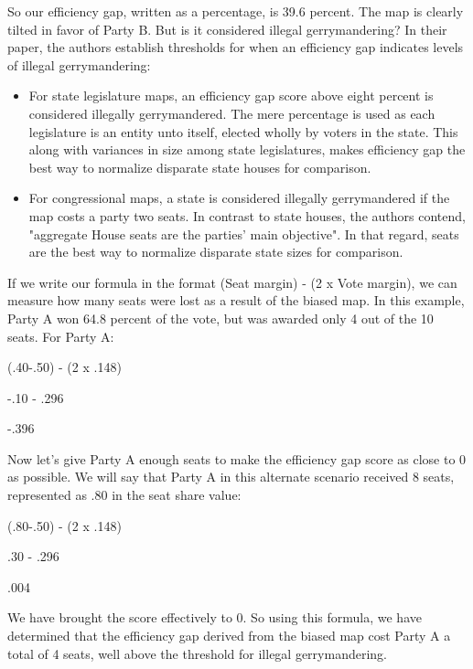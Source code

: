 \documentclass[sigconf]{acmart}
\begin{document}
So our efficiency gap, written as a percentage, is 39.6 percent. The map is clearly tilted in favor of Party B. But is it considered illegal gerrymandering? In their paper, the authors establish thresholds for when an efficiency gap indicates levels of illegal gerrymandering:

\begin{itemize}
    \item For state legislature maps, an efficiency gap score above eight percent is considered illegally gerrymandered. The mere percentage is used as each legislature is an entity unto itself, elected wholly by voters in the state. This along with variances in size among state legislatures, makes efficiency gap the best way to normalize disparate state houses for comparison.
    \item For congressional maps, a state is considered illegally gerrymandered if the map costs a party two seats. In contrast to state houses, the authors contend, "aggregate House seats are the parties' main objective". In that regard, seats are the best way to normalize disparate state sizes for comparison.\cite{chicagothreshold}
\end{itemize}

If we write our formula in the format (Seat margin) - (2 x Vote margin), we can measure how many seats were lost as a result of the biased map. In this example, Party A won 64.8 percent of the vote, but was awarded only 4 out of the 10 seats. For Party A:

\begin{center}
    (.40-.50) - (2 x .148)
    
    -.10 - .296
    
    -.396
\end{center}

Now let's give Party A enough seats to make the efficiency gap score as close to 0 as possible. We will say that Party A in this alternate scenario received 8 seats, represented as .80 in the seat share value:

\begin{center}
    (.80-.50) - (2 x .148)
    
    .30 - .296
    
    .004
\end{center}

We have brought the score effectively to 0. So using this formula, we have determined that the efficiency gap derived from the biased map cost Party A a total of 4 seats, well above the threshold for illegal gerrymandering.
\end{document}
